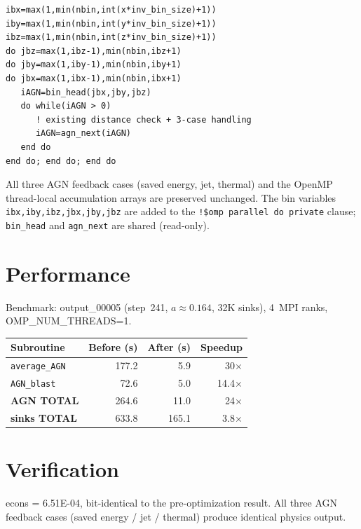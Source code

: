 \documentclass[11pt,fleqn]{book}
\begin{document}
\begin{codebox}[Cell inner loop (replaces \texttt{do iAGN=1,nAGN})]
\begin{lstlisting}[style=fortran]
ibx=max(1,min(nbin,int(x*inv_bin_size)+1))
iby=max(1,min(nbin,int(y*inv_bin_size)+1))
ibz=max(1,min(nbin,int(z*inv_bin_size)+1))
do jbz=max(1,ibz-1),min(nbin,ibz+1)
do jby=max(1,iby-1),min(nbin,iby+1)
do jbx=max(1,ibx-1),min(nbin,ibx+1)
   iAGN=bin_head(jbx,jby,jbz)
   do while(iAGN > 0)
      ! existing distance check + 3-case handling
      iAGN=agn_next(iAGN)
   end do
end do; end do; end do
\end{lstlisting}
\end{codebox}

All three AGN feedback cases (saved energy, jet, thermal) and the OpenMP thread-local accumulation arrays are preserved unchanged. The bin variables \texttt{ibx,iby,ibz,jbx,jby,jbz} are added to the \texttt{!\$omp~parallel~do~private} clause; \texttt{bin\_head} and \texttt{agn\_next} are shared (read-only).

\section{Performance}

Benchmark: output\_00005 (step~241, $a \approx 0.164$, 32K sinks), 4~MPI ranks, OMP\_NUM\_THREADS=1.

\begin{center}
\begin{tabular}{lrrr}
\toprule
\textbf{Subroutine} & \textbf{Before (s)} & \textbf{After (s)} & \textbf{Speedup} \\
\midrule
\texttt{average\_AGN} & 177.2 & 5.9 & 30$\times$ \\
\texttt{AGN\_blast}   &  72.6 & 5.0 & 14.4$\times$ \\
\midrule
\textbf{AGN TOTAL}    & 264.6 & 11.0 & 24$\times$ \\
\textbf{sinks TOTAL}  & 633.8 & 165.1 & 3.8$\times$ \\
\bottomrule
\end{tabular}
\end{center}

\section{Verification}

econs = 6.51E-04, bit-identical to the pre-optimization result. All three AGN feedback cases (saved energy / jet / thermal) produce identical physics output.
\end{document}

